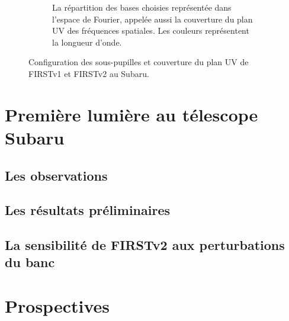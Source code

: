 \begin{figure}[ht!]
\begin{subfigure}[t]{0.55\textwidth}
        \caption{La répartition des bases choisies représentée dans l'espace de Fourier, appelée aussi la couverture du plan UV des fréquences spatiales. Les couleurs représentent la longueur d'onde.}
        \label{fig:SegUVSubaruA}
    \end{subfigure}
    \caption[Configuration des sous-pupilles et couverture du plan UV de FIRSTv1 et FIRSTv2 au Subaru.]{Configuration des sous-pupilles et couverture du plan UV de FIRSTv1 et FIRSTv2 au Subaru.}
    \label{fig:SegUVSubaru}
\end{figure}


\section{Première lumière au télescope Subaru}

\subsection{Les observations}

\subsection{Les résultats préliminaires}

\subsection{La sensibilité de FIRSTv2 aux perturbations du banc}


\section{Prospectives}
